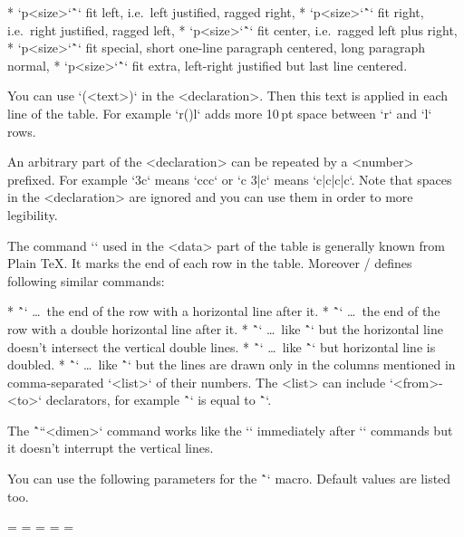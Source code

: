 \begitems
* `p{<size>`\^`\fL}` fit left, i.e.\ left justified, ragged right,
* `p{<size>`\^`\fR}` fit right, i.e.\ right justified, ragged left,
* `p{<size>`\^`\fC}` fit center, i.e.\ ragged left plus right,
* `p{<size>`\^`\fS}` fit special, short one-line paragraph centered,
                long paragraph normal,
* `p{<size>`\^`\fX}` fit extra, left-right justified but last line centered.
\enditems

You can use `(<text>)` in the <declaration>. Then this text is applied in
each line of the table. For example `r(\kern10pt)l` adds more 10\,pt space
between `r` and `l` rows.

An arbitrary part of the <declaration> can be repeated by a <number>
prefixed. For example `3c` means `ccc` or `c 3{|c}` means
`c|c|c|c`. Note that spaces in the <declaration> are ignored and you
can use them in order to more legibility.

The command `\cr` used in the <data> part of the table
is generally known from Plain \TeX. It marks the end of each row in the table.
Moreover \OpTeX/ defines following similar commands:

\begitems
* \^`\crl` \dots\ the end of the row with a horizontal line after it.
* \^`\crll` \dots\ the end of the row with a double horizontal line after it.
* \^`\crli` \dots\ like \^`\crl` but the horizontal line doesn't intersect the
      vertical double lines.
* \^`\crlli` \dots\ like \^`\crli` but horizontal line is doubled.
* \^`` \dots\ like \^`\crli` but the lines are drawn only in the
  columns mentioned in comma-separated `<list>` of their numbers.
  The <list> can include `<from>-<to>` declarators, for example
  \^`` is equal to \^``.
\enditems

The \^`\tskip``<dimen>` command works like the ``
immediately after `\cr*` commands but it doesn't interrupt the vertical lines.

\new
You can use the following parameters for the \^`\table` macro. Default values are listed
too.

\begtt
\everytable={}       %
\thistable={}        %
\tabiteml={\enspace} %
\tabitemr={\enspace} %
\tabstrut={\strut}   %
\tablinespace=2pt    %
\vvkern=1pt          %
\hhkern=1pt          %
\tabskip=0pt         %
\tabskipl=0pt \tabskipr=0pt %
\endtt

